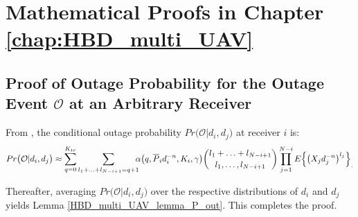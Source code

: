 \chapter{Mathematical Proofs in Chapter \ref{chap:HBD_multi_UAV}}
\label{chap:Appendix_D}
\section{Proof of Outage Probability for the Outage Event $\mathcal{O}$ at an Arbitrary Receiver} \label{HBD_multi_UAV_lemma_P_out_proof}
From \cite[eq. (6)]{ernest2019outage}, the conditional outage probability $Pr\big(\mathcal{O}|d_i, d_j\big)$ at receiver $i$ is: 
\begin{eqnarray} 
Pr\big(\mathcal{O}|d_i, d_j\big) \approx \sum_{q=0}^{K_{tr}} \sum_{l_1+\ldots+l_{N-i+1}=q+1} \hspace{-0.2cm} \alpha\big(q,\overline{P}_i d_i^{-n},K_{i},\gamma\big) \binom{l_1 + \ldots + l_{N-i+1}}{l_1,\ldots, l_{N-i+1}} \prod_{j=1}^{N-i} E\Big\{\big(X_{j}d_j^{-n}\big)^{l_j}\Big\}_.
\end{eqnarray}

Thereafter, averaging $Pr\big(\mathcal{O}|d_i, d_j\big)$ over the respective distributions of $d_i$ and $d_j$ yields Lemma \ref{HBD_multi_UAV_lemma_P_out}. This completes the proof.


